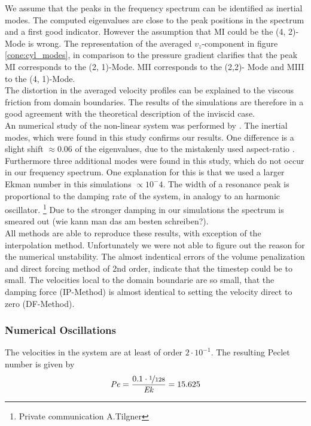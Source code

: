 We assume that the peaks in the frequency spectrum can be identified as inertial modes.
The computed eigenvalues  are close to the peak positions in the spectrum and a first good indicator.
However  the assumption that M\RN{1} could be the (4, 2)-Mode is wrong.
The representation of the averaged $v_z$-component in figure \ref{cone:cyl_modes}, in comparison to the pressure gradient
clarifies that the peak M\RN{1} corresponds to the (2, 1)-Mode.
M\RN{2} corresponds to the (2,2)- Mode and M\RN{3}  to the (4, 1)-Mode.\\
The distortion in the averaged velocity profiles can be explained to the viscous friction from domain boundaries.
The results of the simulations are therefore in a good agreement with the theoretical description of the inviscid case.
\\
An numerical study of the non-linear system was performed by \citep{Sauret2012}.
The inertial modes, which were found in this study confirms our results.
One difference is a slight shift $\approx0.06$ of the eigenvalues,
due to the mistakenly used aspect-ratio .
Furthermore three additional modes were found in this study, which do not occur
in our frequency spectrum.
One explanation for this is that we used a  larger Ekman number in this simulations $\propto10^-4$.
The width of a resonance peak is proportional to the damping rate of the system, in analogy to an harmonic oscillator.
\footnote{Private communication A.Tilgner}
Due to the stronger damping in our simulations the spectrum is smeared out (wie kann man das am besten schreiben?).\\
All methods are able to reproduce these results, with exception of the interpolation method.
Unfortunately we were not able to figure out the reason for the numerical unstability.
The almost indentical errors of the volume penalization and direct forcing method of 2nd order,
indicate that the timestep could be to small.
The velocities local to the domain boundarie are so small, that the damping force (IP-Method) is almost identical
to setting the velocity direct to zero (DF-Method).

\subsubsection{Numerical Oscillations}

The velocities in the system are at least of order $2\cdot10^{-1}$. The resulting Peclet number is
given by
\begin{align}
    \mbox{\textit{Pe}} = \frac{0.1\cdot\nicefrac{1}{128}}{\mbox{\textit{Ek}}} =15.625
\end{align}

